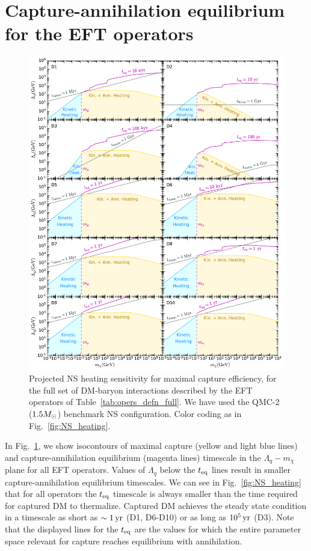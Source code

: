 \section{Capture-annihilation equilibrium for the EFT operators}
\label{sec:resultsEFTop}

\begin{figure}
    \centering
    \includegraphics[width=\textwidth]{ann_heat_sensitivity.pdf}    
    \caption{Projected NS heating sensitivity for maximal capture efficiency, for the full set of DM-baryon interactions described by the EFT operators of Table~\ref{tab:opers_defn_full}. We have used the QMC-2 ($1.5M_\odot$) benchmark NS configuration.  
    Color coding as in Fig.~\ref{fig:NS_heating}. 
    }
    \label{fig:NS_heating2}
\end{figure}



In Fig.~\ref{fig:NS_heating2}, we show isocontours of maximal capture (yellow and light blue lines) and capture-annihilation equilibrium (magenta lines) timescale in the $\Lambda_q-m_\chi$ plane for all  EFT operators.  
Values of $\Lambda_q$ below the $t_{\rm eq}$ lines result in smaller capture-annihilation equilibrium timescales. 
We can see in Fig.~\ref{fig:NS_heating} that for all operators the $t_{\rm eq}$ timescale is always smaller than the time required for captured DM to thermalize. Captured DM achieves the steady state condition in a timescale as short as $\sim1{\rm \,yr}$ (D1, D6-D10) or as long as $10^5{\rm \,yr}$ (D3). 
Note that the displayed lines for the $t_{\rm eq}$ are the values for which the entire parameter space relevant for capture reaches equilibrium with annihilation. 

